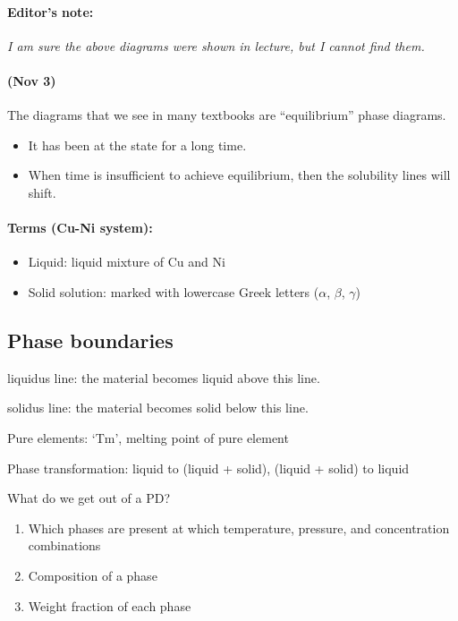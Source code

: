 \documentclass{article}
\begin{document}
\paragraph{Editor's note:} \textit{I am sure the above diagrams were shown in lecture, but I cannot find them.}

\paragraph{(Nov 3)} The diagrams that we see in many textbooks are ``equilibrium'' phase diagrams.
\begin{itemize}
    \item It has been at the state for a long time.
    \item When time is insufficient to achieve equilibrium, then the solubility lines will shift.
\end{itemize}

\paragraph{Terms (Cu-Ni system): }
\begin{itemize}
    \item Liquid: liquid mixture of Cu and Ni
    \item Solid solution: marked with lowercase Greek letters ($\alpha$, $\beta$, $\gamma$)
\end{itemize}

\subsection{Phase boundaries}

liquidus line: the material becomes liquid above this line.

solidus line: the material becomes solid below this line.

Pure elements: `Tm', melting point of pure element

Phase transformation: liquid to (liquid + solid), (liquid + solid) to liquid

What do we get out of a PD?
\begin{enumerate}
    \item Which phases are present at which temperature, pressure, and concentration combinations
    \item Composition of a phase
    \item Weight fraction of each phase
\end{enumerate}
\end{document}
